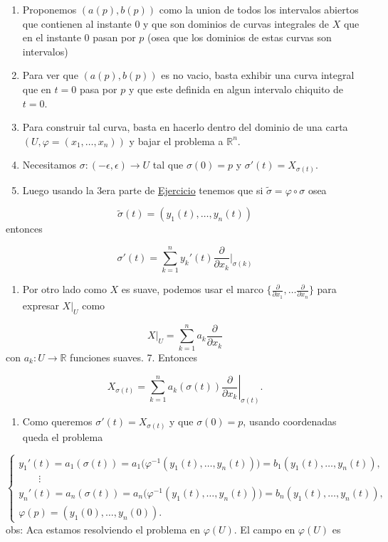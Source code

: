 \begin{bookproof}{}
\begin{enumerate}
\item Proponemos $(a(p),b(p))$ como la union de todos los intervalos abiertos que contienen al instante $0$ y que son dominios de curvas integrales de $X$ que en el instante $0$ pasan por $p$ (osea que los dominios de estas curvas son intervalos)
\item Para ver que $(a(p),b(p))$ es no vacio, basta exhibir una curva integral que en $t=0$ pasa por $p$ y que este definida en algun intervalo chiquito de $t=0$.
\item Para construir tal curva, basta en hacerlo dentro del dominio de una carta $(U,\varphi=(x_1,\ldots,x_n))$ y bajar el problema a $\mathbb R^n$.
\item Necesitamos $\sigma:(-\epsilon,\epsilon)\to U$ tal que $\sigma(0)=p$ y $\sigma'(t)=X_{\sigma(t)}$.
\item Luego usando la 3era parte de \hyperref[blk:6da36a]{Ejercicio} tenemos que si $\widetilde \sigma=\varphi\circ\sigma$ osea
\end{enumerate}
\[
\widetilde \sigma(t)=(y_1(t),\ldots,y_n(t))
\]
entonces

\[
\sigma'(t)=\sum^{n}_{k=1} y_{k}'(t)\frac{\partial}{\partial x_{k}}\bigg|_{\sigma(k)}
\]
\begin{enumerate}[start=6]
\item Por otro lado como $X$ es suave, podemos usar el marco $\big\{ \frac{\partial}{\partial x_{1}},\ldots \frac{\partial}{\partial x_{n}} \big\}$ para expresar $X|_{U}$ como
\end{enumerate}
\[
X|_U=\sum_{k=1}^n a_k\frac{\partial}{\partial x_k}
\]
con $a_k:U\to\mathbb R$ funciones suaves. 7. Entonces

\[
X_{\sigma(t)}=\sum_{k=1}^n a_k(\sigma(t))\left.\frac{\partial}{\partial x_k}\right|_{\sigma(t)}.
\]
\begin{enumerate}[start=8]
\item Como queremos $\sigma'(t)=X_{\sigma(t)}$ y que $\sigma(0)=p$, usando coordenadas queda el problema
\end{enumerate}
\[
\begin{cases}y_1'(t)=a_1(\sigma(t))=a_1\bigl(\varphi^{-1}(y_1(t),\dots,y_n(t))\bigr)=b_1(y_1(t),\dots,y_n(t)),\\\qquad\vdots\\y_n'(t)=a_n(\sigma(t))=a_n\bigl(\varphi^{-1}(y_1(t),\dots,y_n(t))\bigr)=b_n(y_1(t),\dots,y_n(t)),\\\varphi(p)=(y_1(0),\dots,y_n(0)).\end{cases}
\]
obs: Aca estamos resolviendo el problema en $\varphi(U)$. El campo en $\varphi(U)$ es


\end{bookproof}
